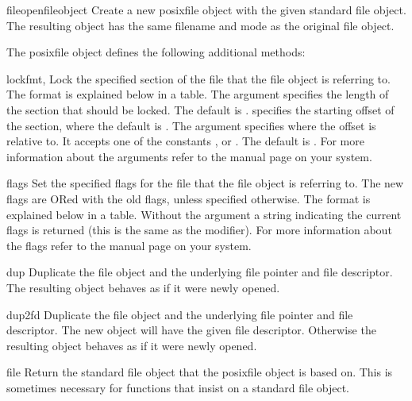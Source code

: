 \begin{funcdesc}{fileopen}{fileobject}
 Create a new posixfile object with the given standard file object.
 The resulting object has the same filename and mode as the original
 file object.
\end{funcdesc}

The posixfile object defines the following additional methods:

\begin{funcdesc}{lock}{fmt, }
 Lock the specified section of the file that the file object is
 referring to.  The format is explained
 below in a table.  The  argument specifies the length of the
 section that should be locked. The default is . 
 specifies the starting offset of the section, where the default is
 .  The  argument specifies where the offset is
 relative to. It accepts one of the constants ,
  or .  The default is
 .  For more information about the arguments refer
 to the  manual page on your system.
\end{funcdesc}

\begin{funcdesc}{flags}{}
 Set the specified flags for the file that the file object is referring
 to.  The new flags are ORed with the old flags, unless specified
 otherwise.  The format is explained below in a table.  Without
 the  argument
 a string indicating the current flags is returned (this is
 the same as the  modifier).  For more information about the
 flags refer to the  manual page on your system.
\end{funcdesc}

\begin{funcdesc}{dup}{}
 Duplicate the file object and the underlying file pointer and file
 descriptor.  The resulting object behaves as if it were newly
 opened.
\end{funcdesc}

\begin{funcdesc}{dup2}{fd}
 Duplicate the file object and the underlying file pointer and file
 descriptor.  The new object will have the given file descriptor.
 Otherwise the resulting object behaves as if it were newly opened.
\end{funcdesc}

\begin{funcdesc}{file}{}
 Return the standard file object that the posixfile object is based
 on.  This is sometimes necessary for functions that insist on a
 standard file object.
\end{funcdesc}

